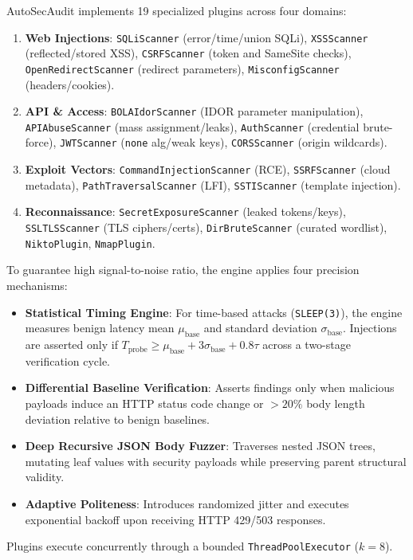 \documentclass[conference]{IEEEtran}
\begin{document}
AutoSecAudit implements 19 specialized plugins across four domains:
\begin{enumerate}
    \item \textbf{Web Injections}: \texttt{SQLiScanner} (error/time/union SQLi), \texttt{XSSScanner} (reflected/stored XSS), \texttt{CSRFScanner} (token and SameSite checks), \texttt{OpenRedirectScanner} (redirect parameters), \texttt{MisconfigScanner} (headers/cookies).
    \item \textbf{API \& Access}: \texttt{BOLAIdorScanner} (IDOR parameter manipulation), \texttt{APIAbuseScanner} (mass assignment/leaks), \texttt{AuthScanner} (credential brute-force), \texttt{JWTScanner} (\texttt{none} alg/weak keys), \texttt{CORSScanner} (origin wildcards).
    \item \textbf{Exploit Vectors}: \texttt{CommandInjectionScanner} (RCE), \texttt{SSRFScanner} (cloud metadata), \texttt{PathTraversalScanner} (LFI), \texttt{SSTIScanner} (template injection).
    \item \textbf{Reconnaissance}: \texttt{SecretExposureScanner} (leaked tokens/keys), \texttt{SSLTLSScanner} (TLS ciphers/certs), \texttt{DirBruteScanner} (curated wordlist), \texttt{NiktoPlugin}, \texttt{NmapPlugin}.
\end{enumerate}

To guarantee high signal-to-noise ratio, the engine applies four precision mechanisms:
\begin{itemize}
    \item \textbf{Statistical Timing Engine}: For time-based attacks (\texttt{SLEEP(3)}), the engine measures benign latency mean $\mu_{\text{base}}$ and standard deviation $\sigma_{\text{base}}$. Injections are asserted only if $T_{\text{probe}} \ge \mu_{\text{base}} + 3\sigma_{\text{base}} + 0.8\tau$ across a two-stage verification cycle.
    \item \textbf{Differential Baseline Verification}: Asserts findings only when malicious payloads induce an HTTP status code change or $>20\%$ body length deviation relative to benign baselines.
    \item \textbf{Deep Recursive JSON Body Fuzzer}: Traverses nested JSON trees, mutating leaf values with security payloads while preserving parent structural validity.
    \item \textbf{Adaptive Politeness}: Introduces randomized jitter and executes exponential backoff upon receiving HTTP 429/503 responses.
\end{itemize}

Plugins execute concurrently through a bounded \texttt{ThreadPoolExecutor} ($k=8$).
\end{document}
